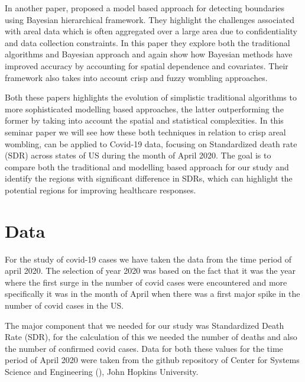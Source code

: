 \documentclass[enabledeprecatedfontcommands,parskip=half,twoside=semi,BCOR=0mm]{scrreprt}
\numberwithin{equation}{chapter}
\theoremstyle{definition}
\theoremstyle{remark}
\begin{document}
    In another paper, \cite{Lu_Carlin.2005} proposed a model based approach for detecting boundaries using Bayesian hierarchical framework. They highlight the challenges associated with areal data which is often aggregated over a large area due to confidentiality and data collection constraints. In this paper they explore both the traditional algorithms and Bayesian approach and again show how Bayesian methods have improved accuracy by accounting for spatial dependence and covariates. Their framework also takes into account crisp and fuzzy wombling approaches.
        
    Both these papers highlights the evolution of simplistic traditional algorithms to more sophisticated modelling based approaches, the latter outperforming the former by taking into account the spatial and statistical complexities. In this seminar paper we will see how these both techniques in relation to crisp areal wombling, can be applied to Covid-19 data, focusing on Standardized death rate (SDR) across states of US during the month of April 2020. The goal is to compare both the traditional and modelling based approach for our study and identify the regions with significant difference in SDRs, which can highlight the potential regions for improving healthcare responses.

    \chapter{Data}
    For the study of covid-19 cases we have taken the data from the time period of april 2020. The selection of year 2020 was based on the fact that it was the year where the first surge in the number of covid cases were encountered and more specifically it was in the month of April when there was a first major spike in the number of covid cases in the US.  
    
    The major component that we needed for our study was Standardized Death Rate (SDR), for the calculation of this we needed the number of deaths and also the number of confirmed covid cases. Data for both these values for the time period of April 2020 were taken from the github repository of Center for Systems Science and Engineering (\cite{CSSE}), John Hopkins University. 
    
\end{document}
